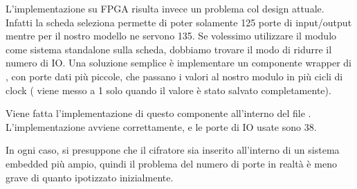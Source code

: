 L'implementazione su FPGA risulta invece un problema col design attuale. Infatti la scheda seleziona permette di poter solamente 125 porte di input/output mentre per il nostro modello ne servono 135. Se volessimo utilizzare il modulo come sistema standalone sulla scheda, dobbiamo trovare il modo di ridurre il numero di IO. Una soluzione semplice è implementare un componente wrapper di , con porte dati più piccole, che passano i valori al nostro modulo in più cicli di clock ( viene messo a 1 solo quando il valore è stato salvato completamente).

Viene fatta l'implementazione di questo componente all'interno del file . L'implementazione avviene correttamente, e le porte di IO usate sono 38.

In ogni caso, si presuppone che il cifratore sia inserito all'interno di un sistema embedded più ampio, quindi il problema del numero di porte in realtà è meno grave di quanto ipotizzato inizialmente.
